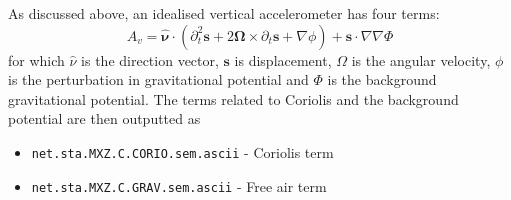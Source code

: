  As discussed above, an idealised vertical accelerometer has four terms: 
 \begin{equation}
     A_v = \mathbf{\hat{\nu}} \cdot \left( \partial_t^2 \mathbf{s} + 2\mathbf{\Omega} \times \partial_t\mathbf{s}  + \nabla\phi \right) + \mathbf{s}\cdot \nabla\nabla\Phi \label{eq:idealised_accelerometer}
 \end{equation}
 for which $\hat{\nu}$ is the direction vector, $\mathbf{s}$ is displacement, ${\Omega}$ is the angular velocity, $\phi$ is the 
 perturbation in gravitational potential and $\Phi$ is the background gravitational potential. The terms related to Coriolis
 and the background potential are then outputted as 
 
 \begin{itemize}
     \item \texttt{net.sta.MXZ.C.CORIO.sem.ascii} - Coriolis term 
     \item \texttt{net.sta.MXZ.C.GRAV.sem.ascii}  - Free air term
 \end{itemize} 